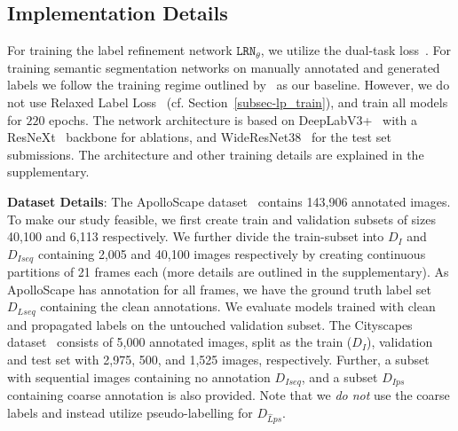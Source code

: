 

\let\clearpage\relax


\let\clearpage\relax


\subsection{Implementation Details}
For training the label refinement network $\mathtt{LRN}_\theta$, we utilize the dual-task loss~\cite{gated_iccv2019}.
For training semantic segmentation networks on manually annotated and generated labels we follow the training regime outlined by~\cite{nvidia_cvpr19} as our baseline. However, we do not use Relaxed Label Loss~\cite{nvidia_cvpr19} (cf. Section~\ref{subsec-lp_train}), and train all models for $220$ epochs. The network architecture is based on DeepLabV3+~\cite{deep_v3} with a ResNeXt~\cite{resnext} backbone for ablations, and WideResNet38~\cite{wider_res38} for the test set submissions.
The architecture and other training details are explained in the supplementary.

\textbf{Dataset Details}: The ApolloScape dataset~\cite{as_dataset} contains 143,906 annotated images. To make our study feasible, we first create train and validation subsets of sizes 40,100 and 6,113 respectively. We further divide the train-subset into $D_I$ and $D_{Iseq}$ containing 2,005 and 40,100 images respectively by creating continuous partitions of 21 frames each (more details are outlined in the supplementary). As ApolloScape has annotation for all frames, we have the ground truth label set $D_{Lseq}$ containing the clean annotations. We evaluate models trained with clean and propagated labels on the untouched validation subset. The Cityscapes dataset~\cite{cs_dataset} consists of 5,000 annotated images, split as the train ($D_{I}$), validation and test set with 2,975, 500, and 1,525 images, respectively. Further, a subset with sequential images containing no annotation $D_{Iseq}$, and a subset $D_{Ips}$ containing coarse annotation is also provided. Note that we \textit{do not} use the coarse labels and instead utilize pseudo-labelling for $D_{\hat{L}ps}$. %


